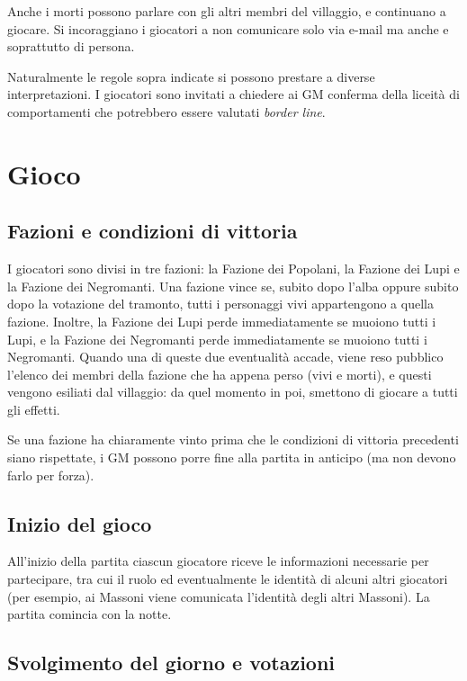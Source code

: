 \documentclass[a4paper,10pt]{article}
\begin{document}
Anche i morti possono parlare con gli altri membri del villaggio, e continuano a giocare. Si incoraggiano i giocatori a non comunicare solo via e-mail ma anche e soprattutto di persona.

Naturalmente le regole sopra indicate si possono prestare a diverse interpretazioni. I giocatori sono invitati a chiedere ai GM conferma della liceità di comportamenti che potrebbero essere valutati \emph{border line}.
\pagebreak

\section{Gioco}

\subsection{Fazioni e condizioni di vittoria}

I giocatori sono divisi in tre fazioni: la Fazione dei Popolani, la Fazione dei Lupi e la Fazione dei Negromanti. Una fazione vince se, subito dopo l'alba oppure subito dopo la votazione del tramonto, tutti i personaggi vivi appartengono a quella fazione. Inoltre, la Fazione dei Lupi perde immediatamente se muoiono tutti i Lupi, e la Fazione dei Negromanti perde immediatamente se muoiono tutti i Negromanti. Quando una di queste due eventualità accade, viene reso pubblico l'elenco dei membri della fazione che ha appena perso (vivi e morti), e questi vengono esiliati dal villaggio: da quel momento in poi, smettono di giocare a tutti gli effetti.

Se una fazione ha chiaramente vinto prima che le condizioni di vittoria precedenti siano rispettate, i GM possono porre fine alla partita in anticipo (ma non devono farlo per forza).

\subsection{Inizio del gioco}

All'inizio della partita ciascun giocatore riceve le informazioni necessarie per partecipare, tra cui il ruolo ed eventualmente le identità di alcuni altri giocatori (per esempio, ai Massoni viene comunicata l'identità degli altri Massoni). La partita comincia con la notte.

\subsection{Svolgimento del giorno e votazioni}
\end{document}
